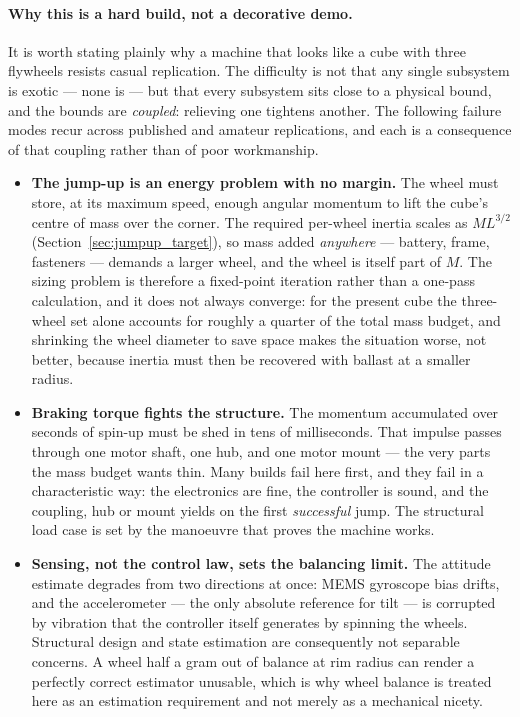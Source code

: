\paragraph{Why this is a hard build, not a decorative demo.} It is worth stating plainly why a machine that looks like a cube with three flywheels resists casual replication. The difficulty is not that any single subsystem is exotic --- none is --- but that every subsystem sits close to a physical bound, and the bounds are \emph{coupled}: relieving one tightens another. The following failure modes recur across published and amateur replications, and each is a consequence of that coupling rather than of poor workmanship.

\begin{itemize}
    \item \textbf{The jump-up is an energy problem with no margin.} The wheel must store, at its maximum speed, enough angular momentum to lift the cube's centre of mass over the corner. The required per-wheel inertia scales as $M L^{3/2}$ (Section~\ref{sec:jumpup_target}), so mass added \emph{anywhere} --- battery, frame, fasteners --- demands a larger wheel, and the wheel is itself part of $M$. The sizing problem is therefore a fixed-point iteration rather than a one-pass calculation, and it does not always converge: for the present cube the three-wheel set alone accounts for roughly a quarter of the total mass budget, and shrinking the wheel diameter to save space makes the situation worse, not better, because inertia must then be recovered with ballast at a smaller radius.

    \item \textbf{Braking torque fights the structure.} The momentum accumulated over seconds of spin-up must be shed in tens of milliseconds. That impulse passes through one motor shaft, one hub, and one motor mount --- the very parts the mass budget wants thin. Many builds fail here first, and they fail in a characteristic way: the electronics are fine, the controller is sound, and the coupling, hub or mount yields on the first \emph{successful} jump. The structural load case is set by the manoeuvre that proves the machine works.

    \item \textbf{Sensing, not the control law, sets the balancing limit.} The attitude estimate degrades from two directions at once: MEMS gyroscope bias drifts, and the accelerometer --- the only absolute reference for tilt --- is corrupted by vibration that the controller itself generates by spinning the wheels. Structural design and state estimation are consequently not separable concerns. A wheel half a gram out of balance at rim radius can render a perfectly correct estimator unusable, which is why wheel balance is treated here as an estimation requirement and not merely as a mechanical nicety.


\end{itemize}
